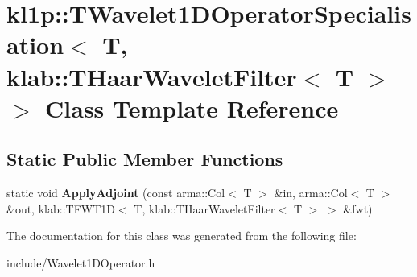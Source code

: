 \hypertarget{classkl1p_1_1TWavelet1DOperatorSpecialisation_3_01T_00_01klab_1_1THaarWaveletFilter_3_01T_01_4_01_4}{}\section{kl1p\+:\+:T\+Wavelet1\+D\+Operator\+Specialisation$<$ T, klab\+:\+:T\+Haar\+Wavelet\+Filter$<$ T $>$ $>$ Class Template Reference}
\label{classkl1p_1_1TWavelet1DOperatorSpecialisation_3_01T_00_01klab_1_1THaarWaveletFilter_3_01T_01_4_01_4}
\subsection*{Static Public Member Functions}
\begin{DoxyCompactItemize}
\item 
static void {\bfseries Apply\+Adjoint} (const arma\+::\+Col$<$ T $>$ \&in, arma\+::\+Col$<$ T $>$ \&out, klab\+::\+T\+F\+W\+T1D$<$ T, klab\+::\+T\+Haar\+Wavelet\+Filter$<$ T $>$ $>$ \&fwt)\hypertarget{classkl1p_1_1TWavelet1DOperatorSpecialisation_3_01T_00_01klab_1_1THaarWaveletFilter_3_01T_01_4_01_4_ab4e876b18f05ae03a4f4f633ee1ef023}{}\label{classkl1p_1_1TWavelet1DOperatorSpecialisation_3_01T_00_01klab_1_1THaarWaveletFilter_3_01T_01_4_01_4_ab4e876b18f05ae03a4f4f633ee1ef023}

\end{DoxyCompactItemize}


The documentation for this class was generated from the following file\+:\begin{DoxyCompactItemize}
\item 
include/Wavelet1\+D\+Operator.\+h\end{DoxyCompactItemize}
